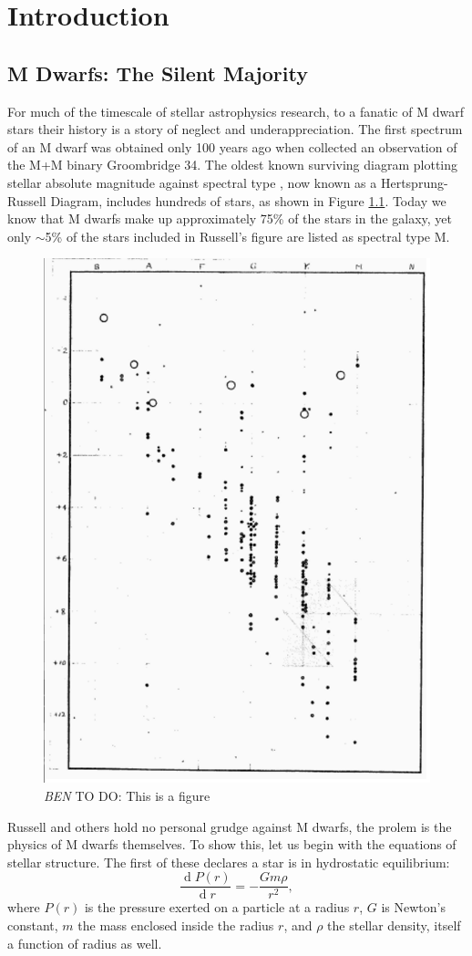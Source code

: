 \documentclass[12pt]{caltech_thesis}
\newcommand{\todo}[3]{{\color{#2} \emph{#1} TO DO: #3}}
\newcommand{\btmtodo}[1]{\todo{BEN}{red}{#1}}
\renewcommand{\d}[1]{\ensuremath{\operatorname{d}\!{#1}}}
\begin{document}
\tableofcontents
\listoffigures
\listoftables

\mainmatter

\chapter{Introduction}

\section{M Dwarfs: The Silent Majority}
For much of the timescale of stellar astrophysics research, to a fanatic 
of M dwarf stars their history is a story of neglect and underappreciation.
The first spectrum of an M dwarf was obtained only 100 years ago when 
\citet{Adams13} collected an observation of the M+M binary Groombridge 34.
The oldest known surviving diagram plotting stellar absolute magnitude against spectral type \citep{Russell14}, now known as a Hertsprung-Russell Diagram, includes hundreds of stars, as shown in Figure \ref{fig:HR}.
Today we know that M dwarfs make up approximately 75\% of the stars in the galaxy,
yet only $\sim$5\% of the stars included in Russell's figure are listed as
spectral type M.



\begin{figure}[hbt!]
\centering
\includegraphics[width=.5\textwidth]{hr.png}
\caption{\btmtodo{This is a figure}}
\label{fig:HR}
\end{figure}

Russell and others hold no personal grudge against M dwarfs, the prolem is the physics
of M dwarfs themselves.
To show this, let us begin with the equations of stellar structure.
The first of these declares a star is in hydrostatic equilibrium:
\begin{equation}
\frac{\d P(r)}{\d r} = - \frac{ G m \rho}{r^2 },
\label{eq:hydro}
\end{equation}
where $P(r)$ is the pressure exerted on a particle at a radius $r$, $G$ is Newton's
constant, $m$ the mass enclosed inside the radius $r$, and $\rho$ the stellar density,
itself a function of radius as well.
\end{document}
